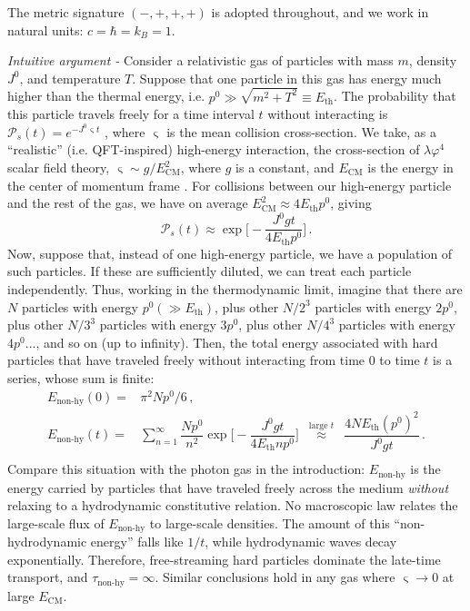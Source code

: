\documentclass[a4paper, amsfonts, amssymb, amsmath, reprint, showkeys, nofootinbib, twoside, onecolumn,notitlepage,,longbibliography]{revtex4-2}
\theoremstyle{definition}
\theoremstyle{theorem}
\theoremstyle{corollary}
\begin{document}
The metric signature $(-,+,+,+)$ is adopted throughout, and we work in natural units: $c=\hbar=k_B=1$.

\newpage

\noindent \textit{Intuitive argument -} Consider a relativistic gas of particles with mass $m$, density $J^0$, and temperature $T$. Suppose that one particle in this gas has energy much higher than the thermal energy, i.e. $p^0 \gg \sqrt{m^2{+}T^2} \equiv E_{\text{th}}$. The probability that this particle travels freely for a time interval $t$ without interacting is $\mathcal{P}_s(t)= e^{-J^0 \upvarsigma t}$ \cite{Lechner:2018bzx,TavernierBook}, where $\upvarsigma$ is the mean collision cross-section. We take, as a ``realistic'' (i.e. QFT-inspired) high-energy interaction, the cross-section of $\lambda \varphi^4$ scalar field theory, $\upvarsigma \sim g/E_{\text{CM}}^2$, where $g$ is a constant, and $E_{\text{CM}}$ is the energy in the center of momentum frame \cite{Peskin_book}. For collisions between our high-energy particle and the rest of the gas, we have on average $E_{\text{CM}}^2 \approx 4E_{\text{th}} p^0$, giving \cite{Denicol:2022bsq}
\begin{equation}\label{jet}
\mathcal{P}_s(t)\approx \exp\bigg[{-}\dfrac{J^0 gt}{4E_{\text{th}} p^0}\bigg] \, .  
\end{equation}
Now, suppose that, instead of one high-energy particle, we have a population of such particles. If these are sufficiently diluted, we can treat each particle independently. Thus, working in the thermodynamic limit, imagine that there are $N$ particles with energy $p^0 (\gg E_{\text{th}})$, plus other $N/2^3$ particles with energy $2p^0$, plus other $N/3^3$ particles with energy $3p^0$, plus other $N/4^3$ particles with energy $4p^0$..., and so on (up to infinity). Then, the total energy associated with hard particles that have traveled freely without interacting from time 0 to time $t$ is a series, whose sum is finite:
\begin{equation}\label{poWeer}
\begin{split}
 E_{\text{non-hy}}(0) ={}& \pi^2 Np^0/6 \, , \\
E_{\text{non-hy}}(t) ={}& \sum_{n=1}^{\infty} \dfrac{Np^0}{n^2} \exp\bigg[{-}\dfrac{J^0 gt}{4E_{\text{th}} np^0} \bigg]  \, \, \, \stackrel{\text{large } t}{\approx} \, \, \, \dfrac{4NE_{\text{th}}(p^0)^2}{J^0gt} \, .\\
\end{split}
\end{equation}
Compare this situation with the photon gas in the introduction: $E_{\text{non-hy}}$ is the energy carried by particles that have traveled freely across the medium \textit{without} relaxing to a hydrodynamic constitutive relation. No macroscopic law relates the large-scale flux of $E_{\text{non-hy}}$ to large-scale densities. The amount of this ``non-hydrodynamic energy'' falls like $1/t$, while hydrodynamic waves decay exponentially. Therefore, free-streaming hard particles dominate the late-time transport, and $\tau_{\text{non-hy}}=\infty$. Similar conclusions hold in any gas where $\upvarsigma {\rightarrow} 0$ at large $E_{\text{CM}}$.
\end{document}
